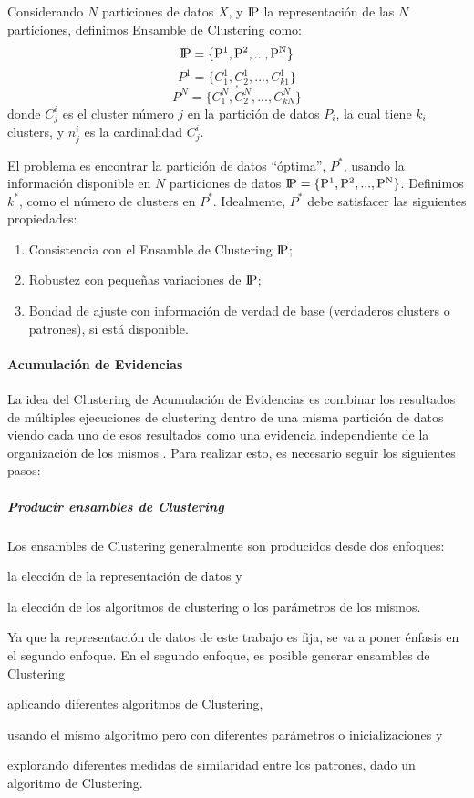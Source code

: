 \bigskip Considerando \(N\) particiones de datos \(X\), y \(\rm I\!P\) la representación de las \(N\) particiones, definimos Ensamble de Clustering como:
\[\rm I\!P = \{P^1, P^2, ..., P^N\}\]
\[P^1 = \{C^1_1, C^1_2, ..., C^1_{k1}\}\]
\[.\]
\[.\]
\[P^N = \{C^N_1, C^N_2, ..., C^N_{kN}\}\]
donde \(C^i_j\) es el cluster número \(j\) en la partición de datos \(P_i\), la cual tiene \(k_i\) clusters, y \(n^i_j\) es la cardinalidad \(C^i_j\).

\bigskip El problema es encontrar la partición de datos “óptima”, \(P^*\), usando la información disponible en \(N\) particiones de datos \(\rm I\!P = \{P^1, P^2, ..., P^N\}\). Definimos \(k^*\), como el número de clusters en \(P^*\). Idealmente, \(P^*\) debe satisfacer las siguientes propiedades:

\begin{enumerate}
	\item Consistencia con el Ensamble de Clustering \(\rm I\!P\);
	\item Robustez con pequeñas variaciones de \(\rm I\!P\);
	\item Bondad de ajuste con información de verdad de base (verdaderos clusters o patrones), si está disponible.
\end{enumerate}

\paragraph{Acumulación de Evidencias}
La idea del Clustering de Acumulación de Evidencias es combinar los resultados de múltiples ejecuciones de clustering dentro de una misma partición de datos viendo cada uno de esos resultados como una evidencia independiente de la organización de los mismos \citep{fred2005combining}. Para realizar esto, es necesario seguir los siguientes pasos:

\subparagraph{Producir ensambles de Clustering}
Los ensambles de Clustering generalmente son producidos desde dos enfoques:
\begin{enumerate*}
	\item la elección de la representación de datos y
	\item la elección de los algoritmos de clustering o los parámetros de los mismos.
\end{enumerate*}
Ya que la representación de datos de este trabajo es fija, se va a poner énfasis en el segundo enfoque. En el segundo enfoque, es posible generar ensambles de Clustering \begin{enumerate*} [label=(\roman*)] \item aplicando diferentes algoritmos de Clustering, \item usando el mismo algoritmo pero con diferentes parámetros o inicializaciones y \item explorando diferentes medidas de similaridad entre los patrones, dado un algoritmo de Clustering.\end{enumerate*}

